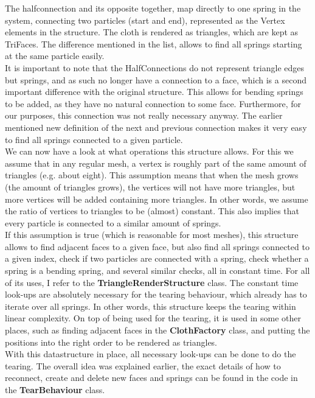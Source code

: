 The halfconnection and its opposite together, map directly to one spring in the system, connecting two particles (start and end), represented as the Vertex elements in the structure. The cloth is rendered as triangles, which are kept as TriFaces. The difference mentioned in the list, allows to find all springs starting at the same particle easily.\\

It is important to note that the HalfConnections do not represent triangle edges but springs, and as such no longer have a connection to a face, which is a second important difference with the original structure. This allows for bending springs to be added, as they have no natural connection to some face. Furthermore, for our purposes, this connection was not really necessary anyway. The earlier mentioned new definition of the next and previous connection makes it very easy to find all springs connected to a given particle.\\

We can now have a look at what operations this structure allows. For this we assume that in any regular mesh, a vertex is roughly part of the same amount of triangles (e.g. about eight). This assumption means that when the mesh grows (the amount of triangles grows), the vertices will not have more triangles, but more vertices will be added containing more triangles. In other words, we assume the ratio of vertices to triangles to be (almost) constant. This also implies that every particle is connected to a similar amount of springs.\\

If this assumption is true (which is reasonable for most meshes), this structure allows to find adjacent faces to a given face, but also find all springs connected to a given index, check if two particles are connected with a spring, check whether a spring is a bending spring, and several similar checks, all in constant time. For all of its uses, I refer to the {\bf TriangleRenderStructure} class. The constant time look-ups are absolutely necessary for the tearing behaviour, which already has to iterate over all springs. In other words, this structure keeps the tearing within linear complexity. On top of being used for the tearing, it is used in some other places, such as finding adjacent faces in the {\bf ClothFactory} class, and putting the positions into the right order to be rendered as triangles.\\

With this datastructure in place, all necessary look-ups can be done to do the tearing. The overall idea was explained earlier, the exact details of how to reconnect, create and delete new faces and springs can be found in the code in the {\bf TearBehaviour} class.

